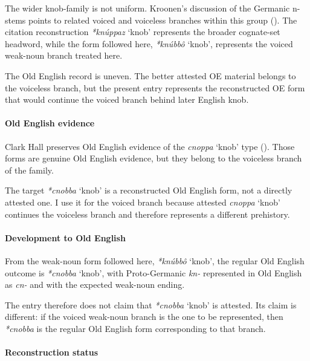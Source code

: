 \documentclass[
  british,
  a4paper,
]{article}
\providecommand{\Recon}[1]{\emph{*#1}}
\begin{document}
The wider knob-family is not uniform. Kroonen's discussion of the
Germanic n-stems points to related voiced and voiceless branches within
this group (). The citation
reconstruction \Recon{knúppaz} `knob' represents the broader cognate-set
headword, while the form followed here, \Recon{knúbbô} `knob',
represents the voiced weak-noun branch treated here.

The Old English record is uneven. The better attested OE material
belongs to the voiceless branch, but the present entry represents the
reconstructed OE form that would continue the voiced branch behind later
English knob.

\paragraph{Old English evidence}\label{old-english-evidence-144}

Clark Hall preserves Old English evidence of the {\emph{cnoppa}} `knob'
type (). Those forms
are genuine Old English evidence, but they belong to the voiceless
branch of the family.

The target \Recon{cnobba} `knob' is a reconstructed Old English form,
not a directly attested one. I use it for the voiced branch because
attested {\emph{cnoppa}} `knob' continues the voiceless branch and
therefore represents a different prehistory.

\paragraph{Development to Old
English}\label{development-to-old-english-144}

From the weak-noun form followed here, \Recon{knúbbô} `knob', the
regular Old English outcome is \Recon{cnobba} `knob', with
Proto-Germanic \emph{kn-} represented in Old English as \emph{cn-} and
with the expected weak-noun ending.

The entry therefore does not claim that \Recon{cnobba} `knob' is
attested. Its claim is different: if the voiced weak-noun branch is the
one to be represented, then \Recon{cnobba} is the regular Old English
form corresponding to that branch.

\paragraph{Reconstruction status}\label{reconstruction-status}
\end{document}
